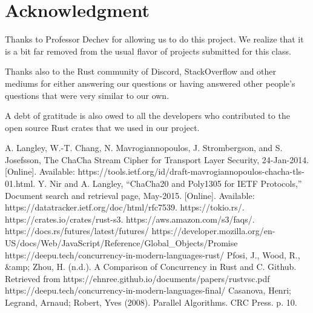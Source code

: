 \documentclass[conference]{IEEEtran}
\begin{document}
\section*{Acknowledgment}

Thanks to Professor Dechev for allowing us to do this project.
We realize that it is a bit far removed from the usual flavor
of projects submitted for this class.

Thanks also to the Rust community of Discord, StackOverflow
and other mediums for either answering our questions or having
answered other people's questions that were very similar to our own.

A debt of gratitude is also owed to all the developers who contributed
to the open source Rust crates that we used in our project.


\begin{thebibliography}{00}
 A. Langley, W.-T. Chang, N. Mavrogiannopoulos, J. Strombergson, and S. Josefsson, The ChaCha Stream Cipher for Transport Layer Security, 24-Jan-2014. [Online]. Available: https://tools.ietf.org/id/draft-mavrogiannopoulos-chacha-tls-01.html.
 Y. Nir and A. Langley, “ChaCha20 and Poly1305 for IETF Protocols,” Document search and retrieval page, May-2015. [Online]. Available: https://datatracker.ietf.org/doc/html/rfc7539.
 https://tokio.rs/.
 https://crates.io/crates/rust-s3.
 https://aws.amazon.com/s3/faqs/.
 https://docs.rs/futures/latest/futures/
 https://developer.mozilla.org/en-US/docs/Web/JavaScript/Reference/Global\_Objects/Promise
 https://deepu.tech/concurrency-in-modern-languages-rust/
 Pfosi, J., Wood, R., &amp; Zhou, H. (n.d.). A Comparison of Concurrency in Rust and C. Github. 
Retrieved from https://ehnree.github.io/documents/papers/rustvsc.pdf 
 https://deepu.tech/concurrency-in-modern-languages-final/
 Casanova, Henri; Legrand, Arnaud; Robert, Yves (2008). Parallel Algorithms. CRC Press. p. 10.

\end{thebibliography}
\vspace{12pt}
\end{document}
